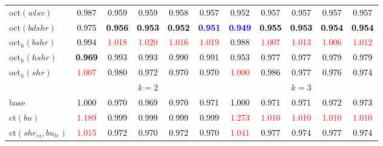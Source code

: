 \begin{tabular}[t]{l|>{}cccc>{}c|ccccc}
oct$(wlsv)$ & \textcolor{black}{0.987} & \textcolor{black}{0.959} & \textcolor{black}{0.959} & \textcolor{black}{0.958} & \textcolor{black}{0.957} & \textcolor{black}{0.952} & \textcolor{black}{0.957} & \textcolor{black}{0.957} & \textcolor{black}{0.957} & \textcolor{black}{0.957}\\
oct$(bdshr)$ & \textcolor{black}{0.975} & \textcolor{black}{\textbf{0.956}} & \textcolor{black}{\textbf{0.953}} & \textcolor{black}{\textbf{0.952}} & \textcolor{blue}{\textbf{0.951}} & \textcolor{blue}{\textbf{0.949}} & \textcolor{black}{\textbf{0.955}} & \textcolor{black}{\textbf{0.953}} & \textcolor{black}{\textbf{0.954}} & \textcolor{black}{\textbf{0.954}}\\
oct$_h(bshr)$ & \textcolor{black}{0.994} & \textcolor{red}{1.018} & \textcolor{red}{1.020} & \textcolor{red}{1.016} & \textcolor{red}{1.019} & \textcolor{black}{0.988} & \textcolor{red}{1.007} & \textcolor{red}{1.013} & \textcolor{red}{1.006} & \textcolor{red}{1.012}\\
oct$_h(hshr)$ & \textcolor{black}{\textbf{0.969}} & \textcolor{black}{0.993} & \textcolor{black}{0.993} & \textcolor{black}{0.990} & \textcolor{black}{0.991} & \textcolor{black}{0.953} & \textcolor{black}{0.977} & \textcolor{black}{0.977} & \textcolor{black}{0.979} & \textcolor{black}{0.979}\\
oct$_h(shr)$ & \textcolor{red}{1.007} & \textcolor{black}{0.980} & \textcolor{black}{0.972} & \textcolor{black}{0.970} & \textcolor{black}{0.970} & \textcolor{red}{1.000} & \textcolor{black}{0.986} & \textcolor{black}{0.977} & \textcolor{black}{0.976} & \textcolor{black}{0.974}\\
\addlinespace[0.3em]
\multicolumn{1}{c}{} & \multicolumn{5}{c}{\textbf{$k = 2$}} & \multicolumn{5}{c}{\textbf{$k = 3$}}\\
base & \textcolor{black}{1.000} & \textcolor{black}{0.970} & \textcolor{black}{0.969} & \textcolor{black}{0.970} & \textcolor{black}{0.971} & \textcolor{black}{1.000} & \textcolor{black}{0.971} & \textcolor{black}{0.971} & \textcolor{black}{0.972} & \textcolor{black}{0.973}\\
ct$(bu)$ & \textcolor{red}{1.189} & \textcolor{black}{0.999} & \textcolor{black}{0.999} & \textcolor{black}{0.999} & \textcolor{black}{0.999} & \textcolor{red}{1.273} & \textcolor{red}{1.010} & \textcolor{red}{1.010} & \textcolor{red}{1.010} & \textcolor{red}{1.010}\\
ct$(shr_{cs}, bu_{te})$ & \textcolor{red}{1.015} & \textcolor{black}{0.972} & \textcolor{black}{0.970} & \textcolor{black}{0.972} & \textcolor{black}{0.970} & \textcolor{red}{1.041} & \textcolor{black}{0.977} & \textcolor{black}{0.974} & \textcolor{black}{0.977} & \textcolor{black}{0.974}\\

\end{tabular}
